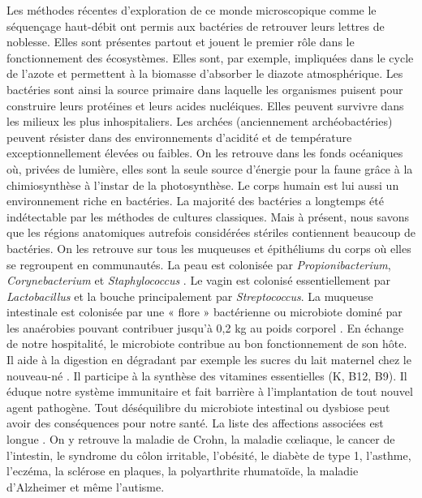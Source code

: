 \documentclass[12pt,a4paper]{article}
\begin{document}
Les méthodes récentes d'exploration de ce monde microscopique comme le séquençage haut-débit ont permis aux bactéries de retrouver leurs lettres de noblesse.
Elles sont présentes partout et jouent le premier rôle dans le fonctionnement des écosystèmes. Elles sont, par exemple, impliquées dans le cycle de l'azote et permettent à la biomasse d'absorber le diazote atmosphérique. Les bactéries sont ainsi la source primaire dans laquelle les organismes puisent pour construire leurs protéines et leurs acides nucléiques.
Elles peuvent survivre dans les milieux les plus inhospitaliers. Les archées (anciennement archéobactéries) peuvent résister dans des environnements d'acidité et de température exceptionnellement élevées ou faibles. On les retrouve dans les fonds océaniques où, privées de lumière, elles sont la seule source d'énergie pour la faune grâce à la chimiosynthèse à l'instar de la photosynthèse.
Le corps humain est lui aussi un environnement riche en bactéries. La majorité des bactéries a longtemps été indétectable par les méthodes de cultures classiques. Mais à présent, nous savons que les régions anatomiques autrefois considérées stériles contiennent beaucoup de bactéries.
On les retrouve sur tous les muqueuses et épithéliums du corps où elles se regroupent en communautés.
La peau est colonisée par \textit{Propionibacterium}, \textit{Corynebacterium} et \textit{Staphylococcus} \cite{Yong2017}. Le vagin est colonisé essentiellement par \textit{Lactobacillus} et la bouche principalement par \textit{Streptococcus}\cite{Yong2017}.
La muqueuse intestinale est colonisée par une « flore » bactérienne ou microbiote dominé par les anaérobies pouvant contribuer jusqu'à 0,2 kg au poids corporel \citep{Sender2016}.
En échange de notre hospitalité, le microbiote contribue au bon fonctionnement de son hôte. Il aide à la digestion en dégradant par exemple les sucres du lait maternel chez le nouveau-né \cite{Bode2012,Yong2017}. Il participe à la synthèse des vitamines essentielles (K, B12, B9)\cite{LeBlanc2013,Yong2017}. Il éduque notre système immunitaire et fait barrière à l'implantation de tout nouvel agent pathogène.
Tout déséquilibre du microbiote intestinal ou dysbiose peut avoir des conséquences pour notre santé. La liste des affections associées est longue \cite{Yong2017}. On y retrouve la maladie de Crohn, la maladie cœliaque, le cancer de l’intestin, le syndrome du côlon irritable, l’obésité, le diabète de type 1, l’asthme, l’eczéma, la sclérose en plaques, la polyarthrite rhumatoïde, la maladie d’Alzheimer et même l’autisme. \\
\end{document}
